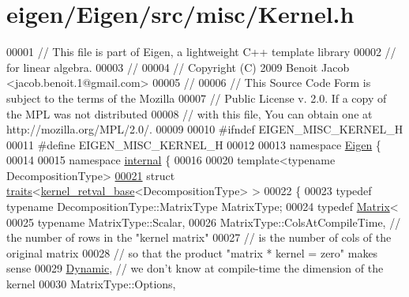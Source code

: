\hypertarget{eigen_2_eigen_2src_2misc_2_kernel_8h_source}{}\section{eigen/\+Eigen/src/misc/\+Kernel.h}
\label{eigen_2_eigen_2src_2misc_2_kernel_8h_source}

\begin{DoxyCode}
00001 \textcolor{comment}{// This file is part of Eigen, a lightweight C++ template library}
00002 \textcolor{comment}{// for linear algebra.}
00003 \textcolor{comment}{//}
00004 \textcolor{comment}{// Copyright (C) 2009 Benoit Jacob <jacob.benoit.1@gmail.com>}
00005 \textcolor{comment}{//}
00006 \textcolor{comment}{// This Source Code Form is subject to the terms of the Mozilla}
00007 \textcolor{comment}{// Public License v. 2.0. If a copy of the MPL was not distributed}
00008 \textcolor{comment}{// with this file, You can obtain one at http://mozilla.org/MPL/2.0/.}
00009 
00010 \textcolor{preprocessor}{#ifndef EIGEN\_MISC\_KERNEL\_H}
00011 \textcolor{preprocessor}{#define EIGEN\_MISC\_KERNEL\_H}
00012 
00013 \textcolor{keyword}{namespace }\hyperlink{namespace_eigen}{Eigen} \{ 
00014 
00015 \textcolor{keyword}{namespace }\hyperlink{namespaceinternal}{internal} \{
00016 
00020 \textcolor{keyword}{template}<\textcolor{keyword}{typename} DecompositionType>
\hyperlink{struct_eigen_1_1internal_1_1traits_3_01kernel__retval__base_3_01_decomposition_type_01_4_01_4}{00021} \textcolor{keyword}{struct }\hyperlink{struct_eigen_1_1internal_1_1traits}{traits}<\hyperlink{struct_eigen_1_1internal_1_1kernel__retval__base}{kernel\_retval\_base}<DecompositionType> >
00022 \{
00023   \textcolor{keyword}{typedef} \textcolor{keyword}{typename} DecompositionType::MatrixType MatrixType;
00024   \textcolor{keyword}{typedef} \hyperlink{group___core___module_class_eigen_1_1_matrix}{Matrix}<
00025     \textcolor{keyword}{typename} MatrixType::Scalar,
00026     MatrixType::ColsAtCompileTime, \textcolor{comment}{// the number of rows in the "kernel matrix"}
00027                                    \textcolor{comment}{// is the number of cols of the original matrix}
00028                                    \textcolor{comment}{// so that the product "matrix * kernel = zero" makes sense}
00029     \hyperlink{namespace_eigen_ad81fa7195215a0ce30017dfac309f0b2}{Dynamic},                       \textcolor{comment}{// we don't know at compile-time the dimension of the kernel}
00030     MatrixType::Options,

\end{DoxyCode}
